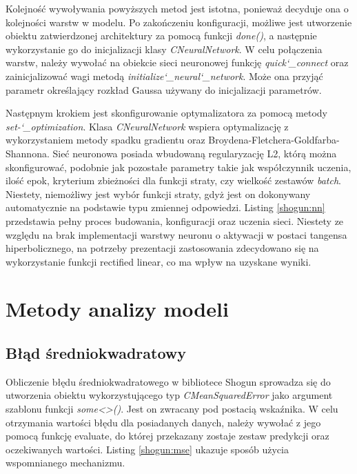 Kolejność wywoływania powyższych metod jest istotna, ponieważ decyduje ona o kolejności warstw w modelu. Po zakończeniu konfiguracji, możliwe jest utworzenie obiektu zatwierdzonej architektury za pomocą funkcji \textit{done()}, a następnie wykorzystanie go do inicjalizacji klasy \textit{CNeuralNetwork}. W celu połączenia warstw, należy wywołać na obiekcie sieci neuronowej funkcję \textit{quick\char`_connect} oraz zainicjalizować wagi metodą \textit{initialize\char`_neural\char`_network}. Może ona przyjąć parametr określający rozkład Gaussa używany do inicjalizacji parametrów.

Następnym krokiem jest skonfigurowanie optymalizatora za pomocą metody \textit{set-\char`_optimization}. Klasa \textit{CNeuralNetwork} wspiera optymalizację z wykorzystaniem metody spadku gradientu oraz Broydena-Fletchera-Goldfarba-Shannona. Sieć neuronowa posiada wbudowaną regularyzację L2, którą można skonfigurować, podobnie jak pozostałe parametry takie jak współczynnik uczenia, ilość epok, kryterium zbieżności dla funkcji straty, czy wielkość zestawów \textit{batch}. Niestety, niemożliwy jest wybór funkcji straty, gdyż jest on dokonywany automatycznie na podstawie typu zmiennej odpowiedzi. Listing \ref{shogun:nn} przedstawia pełny proces budowania, konfiguracji oraz uczenia sieci. Niestety ze względu na brak implementacji warstwy neuronu o aktywacji w postaci tangensa hiperbolicznego, na potrzeby prezentacji zastosowania zdecydowano się na wykorzystanie funkcji rectified linear, co ma wpływ na uzyskane wyniki.


\section{Metody analizy modeli}

\subsection{Błąd średniokwadratowy}

Obliczenie błędu średniokwadratowego w bibliotece Shogun sprowadza się do utworzenia obiektu wykorzystującego typ \textit{CMeanSquaredError} jako argument szablonu funkcji \textit{some<>()}. Jest on zwracany pod postacią wskaźnika. W celu otrzymania wartości błędu dla posiadanych danych, należy wywołać z jego pomocą funkcję evaluate, do której przekazany zostaje zestaw predykcji oraz oczekiwanych wartości. Listing \ref{shogun:mse} ukazuje sposób użycia wspomnianego mechanizmu.

